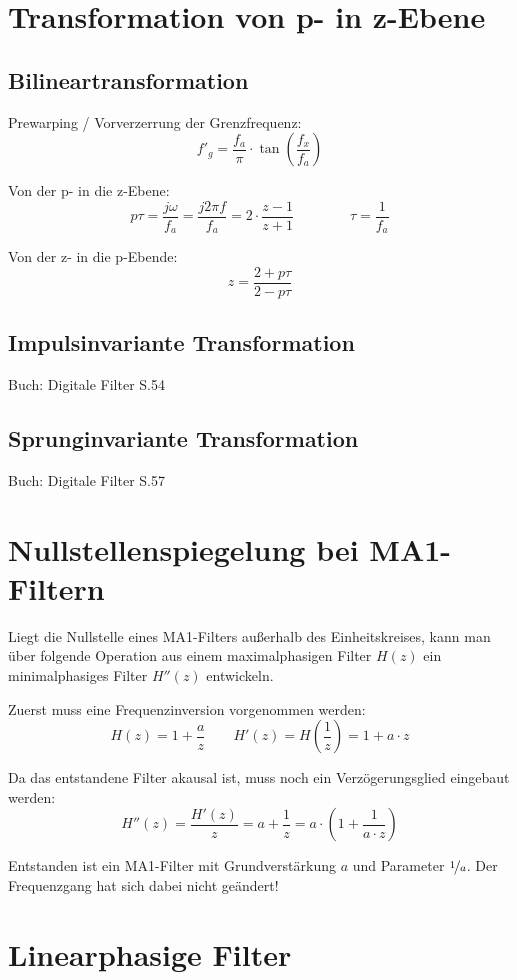 \documentclass[a4paper, 12pt]{report}
\begin{document}
	\section*{Transformation von p- in z-Ebene}
		\subsection*{Bilineartransformation}
			Prewarping / Vorverzerrung der Grenzfrequenz:
			\[ f'_g = \frac{f_a}{\pi} \cdot \tan \left(\frac{f_x}{f_a}\right) \]
		
			Von der p- in die z-Ebene:
			\[ p\tau = \frac{j\omega}{f_a} = \frac{j2\pi f}{f_a} = 2 \cdot \frac{z - 1}{z + 1} \qquad\qquad \tau = \frac{1}{f_a} \]
			
			Von der z- in die p-Ebende:
			\[ z = \frac{2 + p\tau}{2 - p\tau} \]
		
		\subsection*{Impulsinvariante Transformation}
		Buch: Digitale Filter S.54
		
		\subsection*{Sprunginvariante Transformation}
		Buch: Digitale Filter S.57	
	\vspace{1cm}
	\section*{Nullstellenspiegelung bei MA1-Filtern}
		Liegt die Nullstelle eines MA1-Filters außerhalb des Einheitskreises, kann man über folgende Operation aus einem maximalphasigen Filter $ H(z) $ ein minimalphasiges Filter $ H''(z) $ entwickeln.
		
		Zuerst muss eine Frequenzinversion vorgenommen werden:
		\[ H(z) = 1 + \frac{a}{z} \qquad H'(z) = H\left(\frac{1}{z}\right) = 1 + a\cdot z \]
		
		Da das entstandene Filter akausal ist, muss noch ein Verzögerungsglied eingebaut werden:
		\[ H''(z) = \frac{H'(z)}{z} = a + \frac{1}{z} = a \cdot \left(1 + \frac{1}{a \cdot z}\right) \]
		
		Entstanden ist ein MA1-Filter mit Grundverstärkung $ a $ und Parameter $ \nicefrac{1}{a} $. Der Frequenzgang hat sich dabei nicht geändert!
		
			
\clearpage

	\section*{Linearphasige Filter}
		
\end{document}
